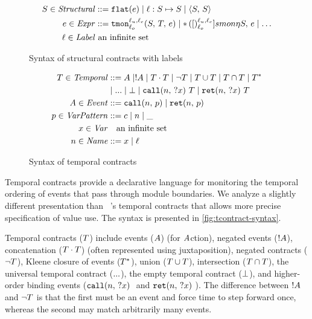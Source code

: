 \FloatBarrier
\begin{figure}
  \begin{align*}
    S \in \mathit{Structural} &::= {\tt flat}(e) \mid \ell : S \mapsto S \mid \langle S,\, S\rangle
\\
    e \in \mathit{Expr} &::= {\tt tmon}{^{\ell_u,\ell_c}_{\ell_o}}({S,\,T,\,e})
                    \mid {\tt *}{\,}({[})^{\ell_u,\ell_c}_{\ell_o}]{smon}{\eta}{S,\, e}
                    \mid \ldots
\\
\ell \in \mathit{Label}&\text{ an infinite set} \\
  \end{align*}
  \caption{Syntax of structural contracts with labels}
  \label{fig:scontract-syntax}
\end{figure}

\begin{figure}
  \begin{align*}
 T \in \mathit{Temporal} &::=
      A \mid ! A
 \mid T \cdot T
 \mid \neg T
 \mid T \cup T
 \mid T \cap T
 \mid T^* \\
&\mid {\tt ...} \mid \bot
 \mid {\tt call}(n,\, {\tt ?}x)\ T
 \mid {\tt ret}(n,\, {\tt ?}x)\ T
\\
A \in \mathit{Event} &::= {\tt call}(n,\, p) \mid {\tt ret}(n,\, p) \\
p \in \mathit{VarPattern} &::= c \mid n \mid \_ \\
x \in \mathit{Var} &\quad\text{an infinite set} \\
n \in \mathit{Name} &::= x \mid \ell
  \end{align*}
  \caption{Syntax of temporal contracts}
  \label{fig:tcontract-syntax}
\end{figure}

Temporal contracts provide a declarative language for monitoring the temporal ordering of events that pass through module boundaries.
%
We analyze a slightly different presentation than ~\citep{ianjohnson:dfm:icfp2011}'s temporal contracts that allows more precise specification of value use.
%
The syntax is presented in \autoref{fig:tcontract-syntax}.

Temporal contracts ($T$) include events ($A$) (for $A$ction), negated events ($! A$), concatenation ($T \cdot T$) (often represented using juxtaposition), negated contracts ($\neg T$), Kleene closure of events ($T^*$), union ($T \cup T$), intersection ($T \cap T$), the universal temporal contract (${\tt ...}$), the empty temporal contract ($\bot$), and higher-order binding events ($\stcall{\mname}{\mvar}$ and $\stret{\mname}{\mvar}$).
%
The difference between $! A$ and $\neg T$ is that the first must be an event and force time to step forward once, whereas the second may match arbitrarily many events.

